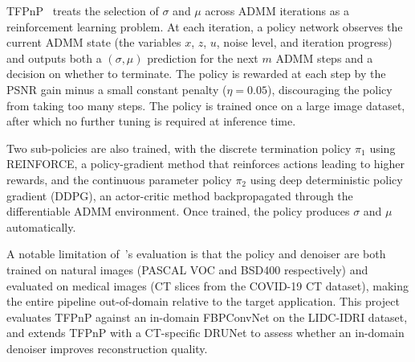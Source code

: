 TFPnP~\citep{Wei2022TFPnP} treats the selection of $\sigma$ and $\mu$ across ADMM iterations as a reinforcement learning problem. At each iteration, a policy network observes the current ADMM state (the variables $x$, $z$, $u$, noise level, and iteration progress) and outputs both a $(\sigma, \mu)$ prediction for the next $m$ ADMM steps and a decision on whether to terminate. The policy is rewarded at each step by the PSNR gain minus a small constant penalty ($\eta = 0.05$), discouraging the policy from taking too many steps. The policy is trained once on a large image dataset, after which no further tuning is required at inference time.

Two sub-policies are also trained, with the discrete termination policy $\pi_1$ using REINFORCE, a policy-gradient method that reinforces actions leading to higher rewards, and the continuous parameter policy $\pi_2$ using deep deterministic policy gradient (DDPG), an actor-critic method backpropagated through the differentiable ADMM environment. Once trained, the policy produces $\sigma$ and $\mu$ automatically.

A notable limitation of~\citet{Wei2022TFPnP}'s evaluation is that the policy and denoiser are both trained on natural images (PASCAL VOC and BSD400 respectively) and evaluated on medical images (CT slices from the COVID-19 CT dataset), making the entire pipeline out-of-domain relative to the target application. This project evaluates TFPnP against an in-domain FBPConvNet on the LIDC-IDRI dataset, and extends TFPnP with a CT-specific DRUNet to assess whether an in-domain denoiser improves reconstruction quality.